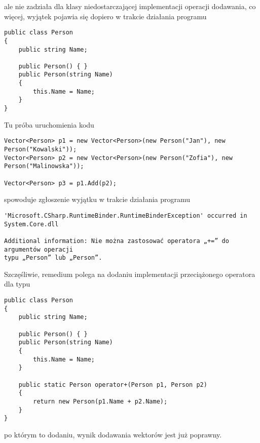 ale nie zadziała dla klasy niedostarczającej implementacji operacji dodawania, co więcej, wyjątek pojawia się 
dopiero w trakcie działania programu

\begin{scriptsize}
\begin{verbatim}
public class Person
{
    public string Name;

    public Person() { }
    public Person(string Name)
    {
        this.Name = Name;
    }
}
\end{verbatim}
\end{scriptsize}

Tu próba uruchomienia kodu

\begin{scriptsize}
\begin{verbatim}
Vector<Person> p1 = new Vector<Person>(new Person("Jan"), new Person("Kowalski"));
Vector<Person> p2 = new Vector<Person>(new Person("Zofia"), new Person("Malinowska"));

Vector<Person> p3 = p1.Add(p2);
\end{verbatim}
\end{scriptsize}

spowoduje zgłoszenie wyjątku w trakcie działania programu

\begin{scriptsize}
\begin{verbatim}
'Microsoft.CSharp.RuntimeBinder.RuntimeBinderException' occurred in System.Core.dll

Additional information: Nie można zastosować operatora „+=” do argumentów operacji 
typu „Person” lub „Person”.
\end{verbatim}
\end{scriptsize}

Szczęśliwie, remedium polega na dodaniu implementacji przeciążonego operatora dla typu

\begin{scriptsize}
\begin{verbatim}
public class Person
{
    public string Name;

    public Person() { }
    public Person(string Name)
    {
        this.Name = Name;
    }

    public static Person operator+(Person p1, Person p2)
    {
        return new Person(p1.Name + p2.Name);
    }
}
\end{verbatim}
\end{scriptsize}

po którym to dodaniu, wynik dodawania wektorów jest już poprawny.

